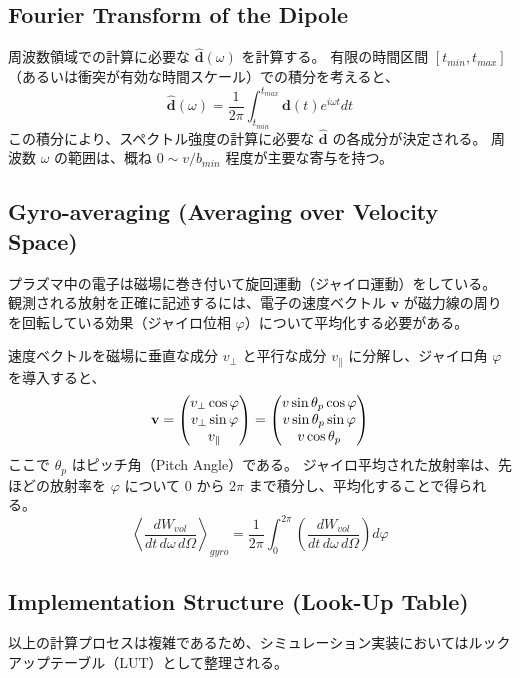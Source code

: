 \documentclass[a4paper,11pt]{bxjsarticle} %
\begin{document}
\subsection{Fourier Transform of the Dipole}
周波数領域での計算に必要な $\hat{\mathbf{d}}(\omega)$ を計算する。
有限の時間区間 $[t_{min}, t_{max}]$（あるいは衝突が有効な時間スケール）での積分を考えると、
\begin{equation}
    \hat{\mathbf{d}}(\omega) = \frac{1}{2\pi} \int_{t_{min}}^{t_{max}} \mathbf{d}(t) e^{i\omega t} dt
\end{equation}
この積分により、スペクトル強度の計算に必要な $\hat{\mathbf{d}}$ の各成分が決定される。
周波数 $\omega$ の範囲は、概ね $0 \sim v/b_{min}$ 程度が主要な寄与を持つ。

\subsection{Gyro-averaging (Averaging over Velocity Space)}
プラズマ中の電子は磁場に巻き付いて旋回運動（ジャイロ運動）をしている。
観測される放射を正確に記述するには、電子の速度ベクトル $\mathbf{v}$ が磁力線の周りを回転している効果（ジャイロ位相 $\varphi$）について平均化する必要がある。

速度ベクトルを磁場に垂直な成分 $v_\perp$ と平行な成分 $v_\parallel$ に分解し、ジャイロ角 $\varphi$ を導入すると、
\begin{equation}
    \mathbf{v} = \mqty(v_\perp \cos\varphi \\ v_\perp \sin\varphi \\ v_\parallel) = \mqty(v \sin\theta_p \cos\varphi \\ v \sin\theta_p \sin\varphi \\ v \cos\theta_p)
\end{equation}
ここで $\theta_p$ はピッチ角（Pitch Angle）である。
ジャイロ平均された放射率は、先ほどの放射率を $\varphi$ について $0$ から $2\pi$ まで積分し、平均化することで得られる。
\begin{equation}
    \left\langle \frac{dW_{vol}}{dt \, d\omega \, d\Omega} \right\rangle_{gyro} = \frac{1}{2\pi} \int_{0}^{2\pi} \left( \frac{dW_{vol}}{dt \, d\omega \, d\Omega} \right) d\varphi
\end{equation}

\subsection{Implementation Structure (Look-Up Table)}
以上の計算プロセスは複雑であるため、シミュレーション実装においてはルックアップテーブル（LUT）として整理される。
\end{document}
